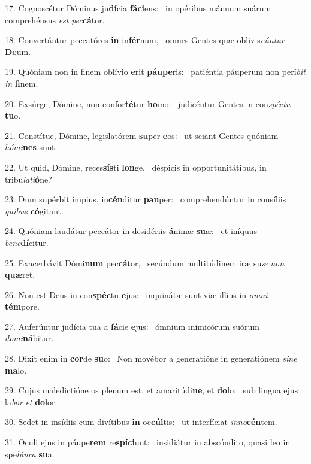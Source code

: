17. Cognoscétur Dóminus ju\textbf{dí}cia \textbf{fá}\textbf{ci}ens: \ast\  in opéribus mánuum suárum comprehénsus \textit{est} \textit{pec}\textbf{cá}tor.\

18. Convertántur peccatóres \textbf{in} in\textbf{fér}num, \ast\  omnes Gentes quæ oblivis\textit{cún}\textit{tur} \textbf{De}um.\

19. Quóniam non in finem oblívio \textbf{e}rit \textbf{páu}\textbf{pe}ris: \ast\  patiéntia páuperum non perí\textit{bit} \textit{in} \textbf{fi}nem.\

20. Exsúrge, Dómine, non confor\textbf{té}tur \textbf{ho}mo: \ast\  judicéntur Gentes in con\textit{spéc}\textit{tu} \textbf{tu}o.\

21. Constítue, Dómine, legislatórem \textbf{su}per \textbf{e}os: \ast\  ut sciant Gentes quóniam \textit{hó}\textit{mi}\textbf{nes} sunt.\

22. Ut quid, Dómine, reces\textbf{sís}ti \textbf{lon}ge, \ast\  déspicis in opportunitátibus, in tribu\textit{la}\textit{ti}\textbf{ó}ne?\

23. Dum supérbit ímpius, in\textbf{cén}ditur \textbf{pau}per: \ast\  comprehendúntur in consíliis \textit{qui}\textit{bus} \textbf{có}gitant.\

24. Quóniam laudátur peccátor in desidériis \textbf{á}nimæ \textbf{su}æ: \ast\  et iníquus \textit{be}\textit{ne}\textbf{dí}citur.\

25. Exacerbávit Dómi\textbf{num} pec\textbf{cá}tor, \ast\  secúndum multitúdinem iræ su\textit{æ} \textit{non} \textbf{quæ}ret.\

26. Non est Deus in con\textbf{spéc}tu \textbf{e}jus: \ast\  inquinátæ sunt viæ illíus in \textit{om}\textit{ni} \textbf{tém}pore.\

27. Auferúntur judícia tua a \textbf{fá}cie \textbf{e}jus: \ast\  ómnium inimicórum suórum \textit{do}\textit{mi}\textbf{ná}bitur.\

28. Dixit enim in \textbf{cor}de \textbf{su}o: \ast\  Non movébor a generatióne in generatiónem \textit{si}\textit{ne} \textbf{ma}lo.\

29. Cujus maledictióne os plenum est, et amaritúdi\textbf{ne}, et \textbf{do}lo: \ast\  sub lingua ejus la\textit{bor} \textit{et} \textbf{do}lor.\

30. Sedet in insídiis cum divítibus \textbf{in} oc\textbf{cúl}tis: \ast\  ut interfíciat \textit{in}\textit{no}\textbf{cén}tem.\

31. Oculi ejus in páupe\textbf{rem} re\textbf{spí}\textbf{ci}unt: \ast\  insidiátur in abscóndito, quasi leo in spe\textit{lún}\textit{ca} \textbf{su}a.\

